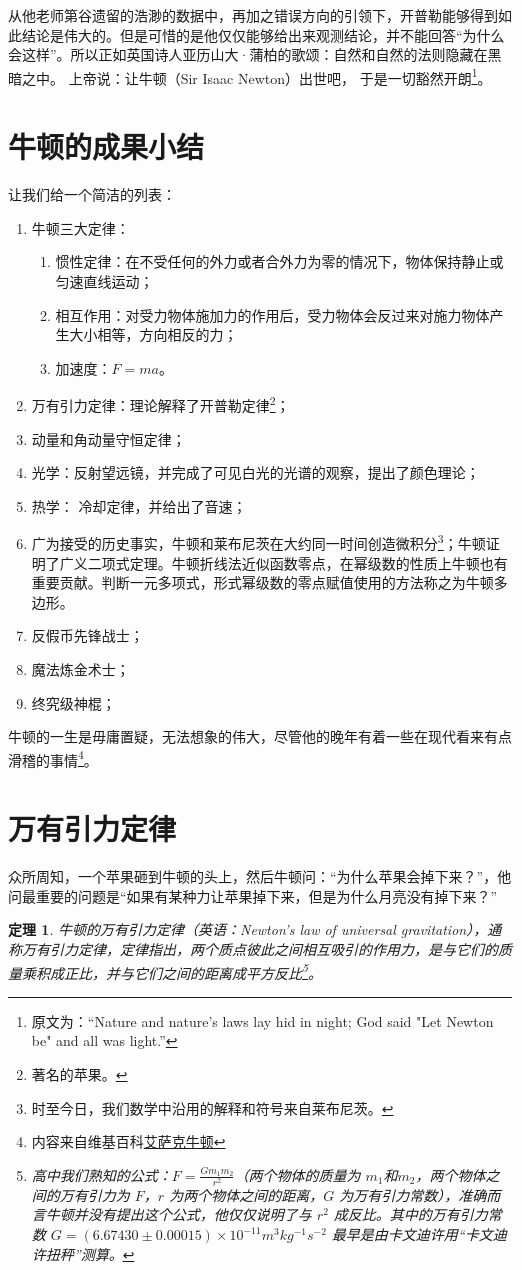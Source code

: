 \documentclass[a4paper]{article}
\newtheorem{theorem}{定理}
\begin{document}
从他老师第谷遗留的浩渺的数据中，再加之错误方向的引领下，开普勒能够得到如此结论是伟大的。但是可惜的是他仅仅能够给出来观测结论，并不能回答“为什么会这样”。所以正如英国诗人亚历山大·蒲柏的歌颂：自然和自然的法则隐藏在黑暗之中。
上帝说：让牛顿（Sir Isaac Newton）出世吧，
于是一切豁然开朗\footnote{原文为：“Nature and nature's laws lay hid in night; God said "Let Newton be" and all was light.”}。
\section{牛顿的成果小结}
让我们给一个简洁的列表：
\begin{enumerate}
    \item 牛顿三大定律：
    \begin{enumerate}
        \item 惯性定律：在不受任何的外力或者合外力为零的情况下，物体保持静止或匀速直线运动；
        \item 相互作用：对受力物体施加力的作用后，受力物体会反过来对施力物体产生大小相等，方向相反的力；
        \item 加速度：$F=ma$。
    \end{enumerate}
    \item 万有引力定律：理论解释了开普勒定律\footnote{著名的苹果。}；

    \item 动量和角动量守恒定律；
    \item 光学：反射望远镜，并完成了可见白光的光谱的观察，提出了颜色理论；
    \item 热学： 冷却定律，并给出了音速；
    \item 广为接受的历史事实，牛顿和莱布尼茨在大约同一时间创造微积分\footnote{时至今日，我们数学中沿用的解释和符号来自莱布尼茨。}；牛顿证明了广义二项式定理。牛顿折线法近似函数零点，在幂级数的性质上牛顿也有重要贡献。判断一元多项式，形式幂级数的零点赋值使用的方法称之为牛顿多边形。
    \item 反假币先锋战士；
    \item 魔法炼金术士；
    \item 终究级神棍；
\end{enumerate}
牛顿的一生是毋庸置疑，无法想象的伟大，尽管他的晚年有着一些在现代看来有点滑稽的事情\footnote{内容来自维基百科\href{https://zh.wikipedia.org/wiki/艾萨克·牛顿}{艾萨克牛顿}}。
\section{万有引力定律}
众所周知，一个苹果砸到牛顿的头上，然后牛顿问：“为什么苹果会掉下来？”，他问最重要的问题是“如果有某种力让苹果掉下来，但是为什么月亮没有掉下来？”
\begin{theorem}
牛顿的万有引力定律（英语：Newton's law of universal gravitation），通称万有引力定律，定律指出，两个质点彼此之间相互吸引的作用力，是与它们的质量乘积成正比，并与它们之间的距离成平方反比\footnote{高中我们熟知的公式：$F=\frac{Gm_{1}m_{2}}{r^{2}}$（两个物体的质量为 $m_{1}$和$m_{2}$，两个物体之间的万有引力为 $F$，$r$ 为两个物体之间的距离，$G$ 为万有引力常数），准确而言牛顿并没有提出这个公式，他仅仅说明了与 $r^{2}$ 成反比。其中的万有引力常数 $G=(6.67430\pm0.00015)\times 10^{-11}m^{3}kg^{-1}s^{-2}$ 最早是由卡文迪许用“卡文迪许扭秤”测算。}。
\end{theorem}
\end{document}
